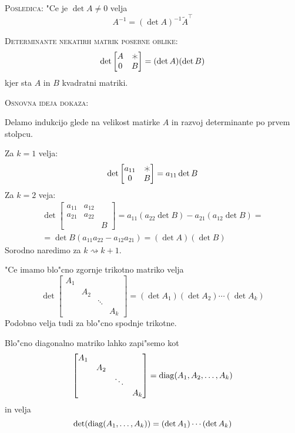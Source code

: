 \begin{enumerate}
	\textsc{Posledica:} "Ce je $\det A \neq 0$ velja
	\begin{equation*}
	A^{-1} = (\det A) ^{-1} \widetilde{A}^\intercal
	\end{equation*}
	
	\textsc{Determinante nekatirh matrik posebne oblike:}
	\begin{equation*}
	\det \begin{bmatrix}
	A & \varhexstar \\
	0 & B
	\end{bmatrix} = (\det A) (\det B)
	\end{equation*}
	kjer sta $A$ in $B$ kvadratni matriki.
	
	\textsc{Osnovna ideja dokaza}:
	
	Delamo indukcijo glede na velikost matirke $A$ in razvoj determinante po prvem stolpcu.

	Za $k = 1$ velja:
	\begin{equation*}
	\det \begin{bmatrix}
	a_{11} & \varhexstar \\
	0 & B
	\end{bmatrix} = a_{11} \det B
	\end{equation*}
	Za $k = 2$ veja:
	\begin{multline*}
	\det \begin{bmatrix}
	a_{11} & a_{12} & \\
	a_{21} & a_{22} & \\
	   		  &            & B
	\end{bmatrix} = a_{11} (a_{22} \det B) - a_{21} (a_{12} \det B) = \\
	= \det B (a_{11} a_{22} - a_{12} a_{21}) = (\det A) (\det B)
	\end{multline*}
	Sorodno naredimo za $k \rightsquigarrow k + 1$.
	
	"Ce imamo blo"cno zgornje trikotno matriko velja
	\begin{equation*}
	\det \begin{bmatrix}
	A_1 & & &\\
	& A_2 & &\\
	& & \ddots & \\
	&&& A_k
	\end{bmatrix} = (\det A_1) (\det A_2) \cdots (\det A_k)
	\end{equation*}
	Podobno velja tudi za blo"cno spodnje trikotne.
	
	Blo"cno diagonalno matriko lahko zapi"semo kot
	\begin{equation*}
	\begin{bmatrix}
	A_1 & & &\\
	& A_2 & &\\
	& & \ddots & \\
	&&& A_k
	\end{bmatrix} = \operatorname{diag} (A_1, A_2, \ldots, A_k)
	\end{equation*}
	in velja
	\begin{equation*}
	\det (\operatorname{diag} (A_1, \ldots, A_k)) = (\det A_1) \cdots (\det A_k)
	\end{equation*}
\end{enumerate}

